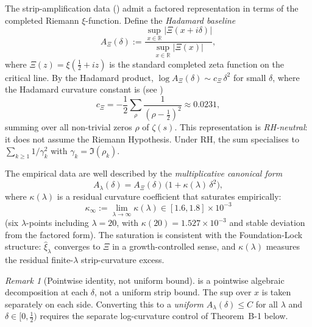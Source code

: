 \documentclass[12pt,a4paper]{article}
\theoremstyle{definition}
\theoremstyle{remark}
\newtheorem{remark}[theorem]{Remark}
\begin{document}
The strip-amplification data () admit a
factored representation in terms of the completed Riemann
$\xi$-function. Define the \emph{Hadamard baseline}
\begin{equation}\label{eq:A-Xi}
  A_\Xi(\delta) := \frac{\sup_{x\in\mathbb R}|\Xi(x+i\delta)|}
                        {\sup_{x\in\mathbb R}|\Xi(x)|},
\end{equation}
where $\Xi(z) = \xi(\tfrac{1}{2}+iz)$ is the standard completed zeta
function on the critical line. By the Hadamard product,
$\log A_\Xi(\delta) \sim c_\Xi\,\delta^2$ for small $\delta$, where the
Hadamard curvature constant is (see )
\begin{equation}\label{eq:c-Xi}
  c_\Xi = -\frac{1}{2}\sum_\rho \frac{1}{(\rho-\tfrac{1}{2})^2}
        \approx 0.0231,
\end{equation}
summing over all non-trivial zeros $\rho$ of $\zeta(s)$. This
representation is \emph{RH-neutral}: it does not assume the Riemann
Hypothesis. Under RH, the sum specialises to
$\sum_{k\geq 1} 1/\gamma_k^2$ with $\gamma_k = \Im(\rho_k)$.

The empirical data are well described by the
\emph{multiplicative canonical form}
\begin{equation}\label{eq:canonical-form}
  A_\lambda(\delta)
  = A_\Xi(\delta)\,\bigl(1 + \kappa(\lambda)\,\delta^2\bigr),
\end{equation}
where $\kappa(\lambda)$ is a residual curvature coefficient that
saturates empirically:
\begin{equation}\label{eq:kappa-inf}
  \kappa_\infty := \lim_{\lambda\to\infty}\kappa(\lambda)
  \in [1.6, 1.8]\times 10^{-3}
\end{equation}
(six $\lambda$-points including $\lambda=20$, with
$\kappa(20)=1.527\times 10^{-3}$ and stable deviation from the
factored form). The saturation is consistent with the
Foundation-Lock structure: $\hat\xi_\lambda$ converges to $\Xi$ in
a growth-controlled sense, and $\kappa(\lambda)$ measures the
residual finite-$\lambda$ strip-curvature excess.

\begin{remark}[Pointwise identity, not uniform bound]
 is a pointwise algebraic decomposition at each
$\delta$, not a uniform strip bound. The sup over $x$ is taken
separately on each side. Converting this to a \emph{uniform}
$A_\lambda(\delta) \leq C$ for all $\lambda$ and
$\delta \in [0,\tfrac{1}{2})$ requires the separate log-curvature
control of Theorem~B-1 below.
\end{remark}
\end{document}
